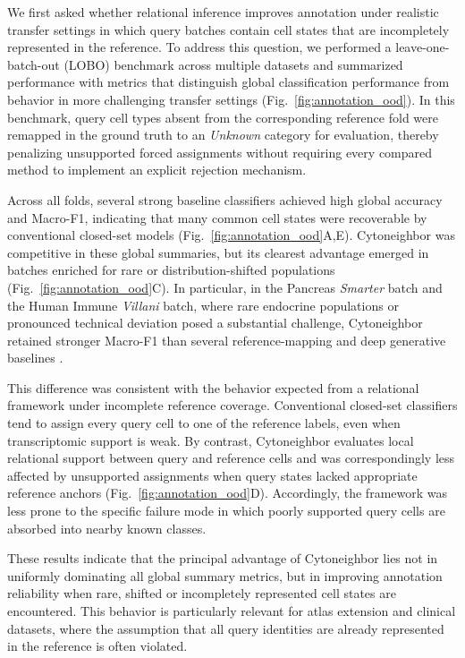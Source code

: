 \documentclass[11pt]{article}
\begin{document}
We first asked whether relational inference improves annotation under realistic transfer settings in which query batches contain cell states that are incompletely represented in the reference. To address this question, we performed a leave-one-batch-out (LOBO) benchmark across multiple datasets and summarized performance with metrics that distinguish global classification performance from behavior in more challenging transfer settings (Fig.~\ref{fig:annotation_ood}). In this benchmark, query cell types absent from the corresponding reference fold were remapped in the ground truth to an \textit{Unknown} category for evaluation, thereby penalizing unsupported forced assignments without requiring every compared method to implement an explicit rejection mechanism.

Across all folds, several strong baseline classifiers achieved high global accuracy and Macro-F1, indicating that many common cell states were recoverable by conventional closed-set models (Fig.~\ref{fig:annotation_ood}A,E). Cytoneighbor was competitive in these global summaries, but its clearest advantage emerged in batches enriched for rare or distribution-shifted populations (Fig.~\ref{fig:annotation_ood}C). In particular, in the Pancreas \textit{Smarter} batch and the Human Immune \textit{Villani} batch, where rare endocrine populations or pronounced technical deviation posed a substantial challenge, Cytoneighbor retained stronger Macro-F1 than several reference-mapping and deep generative baselines \cite{Segerstolpe2016Pancreas,Xin2016Pancreas,Lawlor2017Pancreas,Villani2017Immune}.

This difference was consistent with the behavior expected from a relational framework under incomplete reference coverage. Conventional closed-set classifiers tend to assign every query cell to one of the reference labels, even when transcriptomic support is weak. By contrast, Cytoneighbor evaluates local relational support between query and reference cells and was correspondingly less affected by unsupported assignments when query states lacked appropriate reference anchors (Fig.~\ref{fig:annotation_ood}D). Accordingly, the framework was less prone to the specific failure mode in which poorly supported query cells are absorbed into nearby known classes.

These results indicate that the principal advantage of Cytoneighbor lies not in uniformly dominating all global summary metrics, but in improving annotation reliability when rare, shifted or incompletely represented cell states are encountered. This behavior is particularly relevant for atlas extension and clinical datasets, where the assumption that all query identities are already represented in the reference is often violated.
\end{document}
